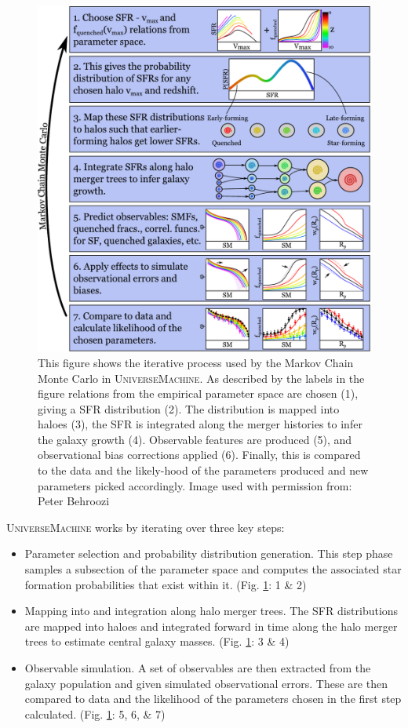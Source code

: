 \begin{figure}[h]
    \centering
    \includegraphics[width = \linewidth]{Figures/Chapter1/sfr_method.pdf}
    \caption{
    This figure shows the iterative process used by the Markov Chain Monte Carlo in U\textsc{niverse}M\textsc{achine}. As described by the labels in the figure relations from the empirical parameter space are chosen (1), giving a SFR distribution (2). The distribution is mapped into haloes (3), the SFR is integrated along the merger histories to infer the galaxy growth (4). Observable features are produced (5), and observational bias corrections applied (6). Finally, this is compared to the data and the likely-hood of the parameters produced and new parameters picked accordingly.
    Image used with permission from: Peter Behroozi \cite{Behroozi2019UniverseMachine:010}}
    \label{fig:BehMeth}
\end{figure}

U\textsc{niverse}M\textsc{achine} works by iterating over three key steps:
\begin{itemize}
    \item Parameter selection and probability distribution generation. This step phase samples a subsection of the parameter space and computes the associated star formation probabilities that exist within it. (Fig. \ref{fig:BehMeth}: 1 \& 2)
    \item Mapping into and integration along halo merger trees. The SFR distributions are mapped into haloes and integrated forward in time along the halo merger trees to estimate central galaxy masses. (Fig. \ref{fig:BehMeth}: 3 \& 4)
    \item Observable simulation. A set of observables are then extracted from the galaxy population and given simulated observational errors. These are then compared to data and the likelihood of the parameters chosen in the first step calculated. (Fig. \ref{fig:BehMeth}: 5, 6, \& 7)
\end{itemize}

